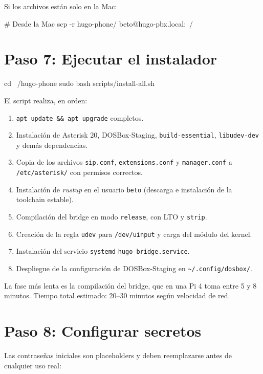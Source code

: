 Si los archivos están solo en la Mac:

\begin{shellcode}
# Desde la Mac
scp -r hugo-phone/ beto@hugo-pbx.local:~/
\end{shellcode}

\section{Paso 7: Ejecutar el instalador}

\begin{shellcode}
cd ~/hugo-phone
sudo bash scripts/install-all.sh
\end{shellcode}

El script realiza, en orden:

\begin{enumerate}
  \item \texttt{apt update \&\& apt upgrade} completos.
  \item Instalación de Asterisk 20, DOSBox-Staging, \texttt{build-essential}, \texttt{libudev-dev} y demás dependencias.
  \item Copia de los archivos \texttt{sip.conf}, \texttt{extensions.conf} y \texttt{manager.conf} a \texttt{/etc/asterisk/} con permisos correctos.
  \item Instalación de \emph{rustup} en el usuario \texttt{beto} (descarga e instalación de la toolchain estable).
  \item Compilación del bridge en modo \texttt{release}, con LTO y \texttt{strip}.
  \item Creación de la regla \texttt{udev} para \texttt{/dev/uinput} y carga del módulo del kernel.
  \item Instalación del servicio \texttt{systemd} \texttt{hugo-bridge.service}.
  \item Despliegue de la configuración de DOSBox-Staging en \texttt{\~{}/.config/dosbox/}.
\end{enumerate}

La fase más lenta es la compilación del bridge, que en una Pi 4 toma entre 5 y 8 minutos. Tiempo total estimado: 20--30 minutos según velocidad de red.

\section{Paso 8: Configurar secretos}

Las contraseñas iniciales son placeholders y deben reemplazarse antes de cualquier uso real:

